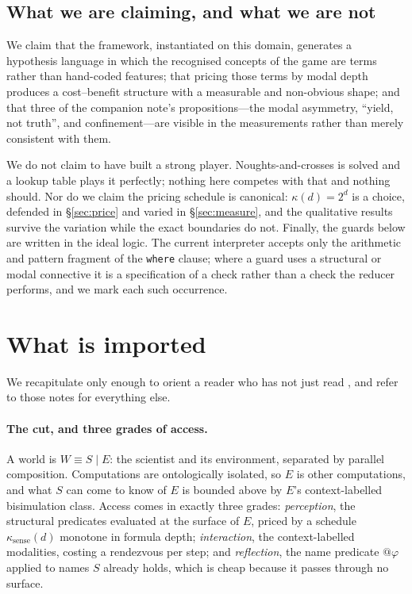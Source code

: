 \documentclass[11pt]{article}
\theoremstyle{definition}
\theoremstyle{plain}
\theoremstyle{remark}
\begin{document}
\subsection{What we are claiming, and what we are not}

We claim that the framework, instantiated on this domain, generates a hypothesis
language in which the recognised concepts of the game are terms rather than
hand-coded features; that pricing those terms by modal depth produces a
cost--benefit structure with a measurable and non-obvious shape; and that three
of the companion note's propositions---the modal asymmetry, ``yield, not
truth'', and confinement---are visible in the measurements rather than merely
consistent with them.

We do not claim to have built a strong player. Noughts-and-crosses is solved and
a lookup table plays it perfectly; nothing here competes with that and nothing
should. Nor do we claim the pricing schedule is canonical: $\kappa(d)=2^{d}$ is
a choice, defended in \S\ref{sec:price} and varied in \S\ref{sec:measure}, and
the qualitative results survive the variation while the exact boundaries do not.
Finally, the guards below are written in the ideal logic. The current
interpreter accepts only the arithmetic and pattern fragment of the
\texttt{where} clause; where a guard uses a structural or modal connective it is
a specification of a check rather than a check the reducer performs, and we mark
each such occurrence.

\section{What is imported}\label{sec:import}

We recapitulate only enough to orient a reader who has not just read
\cite{scientist,classifier}, and refer to those notes for everything else.

\paragraph{The cut, and three grades of access.} A world is $W \equiv S \mid E$:
the scientist and its environment, separated by parallel composition.
Computations are ontologically isolated, so $E$ is other computations, and what
$S$ can come to know of $E$ is bounded above by $E$'s context-labelled
bisimulation class. Access comes in exactly three grades: \emph{perception},
the structural predicates evaluated at the surface of $E$, priced by a schedule
$\kappa_{\mathrm{sense}}(d)$ monotone in formula depth; \emph{interaction}, the
context-labelled modalities, costing a rendezvous per step; and
\emph{reflection}, the name predicate $@\varphi$ applied to names $S$ already
holds, which is cheap because it passes through no surface.
\end{document}
